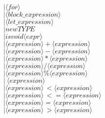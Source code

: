 \documentclass[11pt]{article}
\begin{document}
\begin{enumerate}
                          \color{blue}
                          \hspace*{3.2cm}$|   \langle for\rangle$\\
                          \color{black}
                          \hspace*{3.2cm}$|   \langle block\_expression\rangle$\\
                          \hspace*{3.2cm}$|   \langle let\_expression\rangle$\\
                          \hspace*{3.2cm}$|   new TYPE$\\
                          \hspace*{3.2cm}$|   isvoid \langle expr\rangle$\\
                          \hspace*{3.2cm}$|   \langle expression\rangle + \langle expression\rangle$\\
                          \hspace*{3.2cm}$|   \langle expression\rangle - \langle expression\rangle$\\
                          \hspace*{3.2cm}$|   \langle expression\rangle * \langle expression\rangle$\\
                          \hspace*{3.2cm}$|   \langle expression\rangle / \langle expression\rangle$\\
                          \color{blue}
                          \hspace*{3.2cm}$|   \langle expression\rangle \% \langle expression\rangle$\\
                          \color{black}
                          \hspace*{3.2cm}$|   ~ \langle expression\rangle$\\
                          \hspace*{3.2cm}$|   \langle expression\rangle \, <  \langle expression\rangle$\\
                          \hspace*{3.2cm}$|   \langle expression\rangle \,<= \langle expression\rangle$\\
                          \hspace*{3.2cm}$|   \langle expression\rangle = \langle expression\rangle$\\
                          \color{blue}
                          \hspace*{3.2cm}$|   \langle expression\rangle \,> \langle expression\rangle$\\

\end{enumerate}
\end{document}
